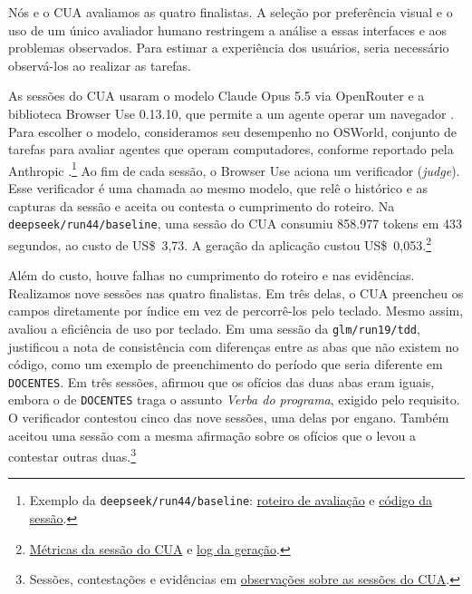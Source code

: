 \documentclass[a4paper,12pt,twoside,english,brazilian]{book}
\begin{document}
Nós e o CUA avaliamos as quatro finalistas.
A seleção por preferência visual e o uso de um único avaliador humano
restringem a análise a essas interfaces e aos problemas observados.
Para estimar a experiência dos usuários, seria necessário observá-los
ao realizar as tarefas.

As sessões do CUA usaram o modelo Claude Opus 5.5 via OpenRouter e a
biblioteca Browser Use 0.13.10, que permite a um agente operar um navegador
\citep{browseruse}. Para escolher o modelo, consideramos seu desempenho no
OSWorld, conjunto de tarefas para avaliar agentes que operam computadores,
conforme reportado pela Anthropic \citep{anthropic2026opus55system}.\footnote{Exemplo da \texttt{deepseek/run44/baseline}:
\href{https://github.com/Educg550/tcc/blob/ee6d001c1f618419c6184644d18aa97bb33bcf9a/demos/runs/batch/deepseek/run44/baseline/_harness/cua-nielsen-opus55-20261011T174407Z/prompt.md}{roteiro de avaliação} e
\href{https://github.com/Educg550/tcc/blob/ee6d001c1f618419c6184644d18aa97bb33bcf9a/demos/runs/batch/deepseek/run44/baseline/_harness/cua-nielsen-opus55-20261011T174407Z/executar.py}{código da sessão}.}
Ao fim de cada sessão, o Browser Use aciona um verificador (\emph{judge}).
Esse verificador é uma chamada ao mesmo modelo, que relê o histórico e as
capturas da sessão e aceita ou contesta o cumprimento do roteiro.
Na \texttt{deepseek/run44/baseline}, uma sessão do CUA consumiu 858.977
tokens em 433 segundos, ao custo de US\$~3,73. A geração da aplicação custou
US\$~0,053.\footnote{\href{https://github.com/Educg550/tcc/blob/ee6d001c1f618419c6184644d18aa97bb33bcf9a/demos/runs/batch/deepseek/run44/baseline/_harness/cua-nielsen-opus55-20261011T174407Z/resultado.json}{Métricas da sessão do CUA} e
\href{https://github.com/Educg550/tcc/blob/ee6d001c1f618419c6184644d18aa97bb33bcf9a/demos/runs/batch/deepseek/run44/baseline/_harness/RUN.log}{log da geração}.}

Além do custo, houve falhas no cumprimento do roteiro e nas evidências.
Realizamos nove sessões nas quatro finalistas. Em três delas, o CUA preencheu
os campos diretamente por índice em vez de percorrê-los pelo teclado. Mesmo
assim, avaliou a eficiência de uso por teclado. Em uma sessão da
\texttt{glm/run19/tdd}, justificou a nota de consistência com diferenças
entre as abas que não existem no código, como um exemplo de preenchimento
do período que seria diferente em \texttt{DOCENTES}. Em três sessões,
afirmou que os ofícios das duas abas eram iguais, embora o de
\texttt{DOCENTES} traga o assunto \emph{Verba do programa}, exigido pelo
requisito. O verificador contestou cinco das nove sessões, uma delas por
engano. Também aceitou uma sessão com a mesma afirmação sobre os ofícios
que o levou a contestar outras duas.\footnote{Sessões, contestações e
evidências em \href{https://github.com/Educg550/tcc/blob/ee6d001c1f618419c6184644d18aa97bb33bcf9a/blog/2026-10-13-observacoes-cua.md}{observações sobre as sessões do CUA}.}
\end{document}
